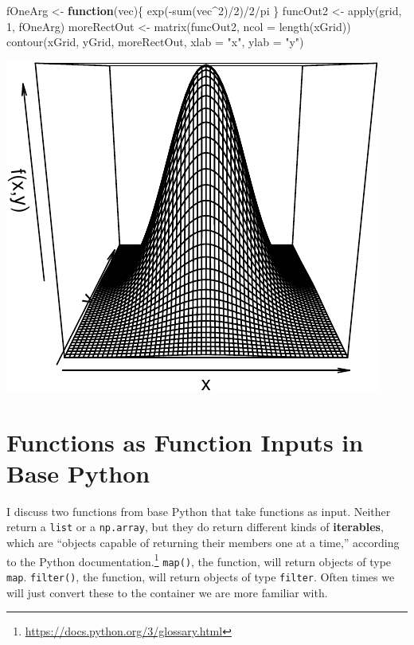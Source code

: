 \documentclass[
  12pt,
]{krantz}
\makeatletter
\newenvironment{Shaded}{\begin{snugshade}}{\end{snugshade}}
\newcommand{\AttributeTok}[1]{\textcolor[rgb]{0.61,0.61,0.61}{#1}}
\newcommand{\ControlFlowTok}[1]{\textcolor[rgb]{0.27,0.27,0.27}{\textbf{#1}}}
\newcommand{\DecValTok}[1]{\textcolor[rgb]{0.06,0.06,0.06}{#1}}
\newcommand{\FunctionTok}[1]{\textcolor[rgb]{0,0,0}{#1}}
\newcommand{\NormalTok}[1]{#1}
\newcommand{\OtherTok}[1]{\textcolor[rgb]{0.37,0.37,0.37}{#1}}
\newcommand{\SpecialCharTok}[1]{\textcolor[rgb]{0,0,0}{#1}}
\newcommand{\StringTok}[1]{\textcolor[rgb]{0.5,0.5,0.5}{#1}}
\renewcommand{\href}[2]{#2\footnote{\url{#1}}}
\newenvironment{kframe}{%
\medskip{}
\setlength{\fboxsep}{.8em}
 \def\at@end@of@kframe{}%
 \ifinner\ifhmode%
  \def\at@end@of@kframe{\end{minipage}}%
  \begin{minipage}{\columnwidth}%
 \fi\fi%
 \def\FrameCommand##1{\hskip\@totalleftmargin \hskip-\fboxsep
 \colorbox{shadecolor}{##1}\hskip-\fboxsep
     \hskip-\linewidth \hskip-\@totalleftmargin \hskip\columnwidth}%
 \MakeFramed {\advance\hsize-\width
   \@totalleftmargin\z@ \linewidth\hsize
   \@setminipage}}%
 {\par\unskip\endMakeFramed%
 \at@end@of@kframe}
\renewenvironment{Shaded}{\begin{kframe}}{\end{kframe}}
\makeatother
\begin{document}
\begin{Shaded}
\begin{Highlighting}[]
\NormalTok{fOneArg }\OtherTok{\textless{}{-}} \ControlFlowTok{function}\NormalTok{(vec)\{}
  \FunctionTok{exp}\NormalTok{(}\SpecialCharTok{{-}}\FunctionTok{sum}\NormalTok{(vec}\SpecialCharTok{\^{}}\DecValTok{2}\NormalTok{)}\SpecialCharTok{/}\DecValTok{2}\NormalTok{)}\SpecialCharTok{/}\DecValTok{2}\SpecialCharTok{/}\NormalTok{pi}
\NormalTok{\} }
\NormalTok{funcOut2 }\OtherTok{\textless{}{-}} \FunctionTok{apply}\NormalTok{(grid, }\DecValTok{1}\NormalTok{, fOneArg)}
\NormalTok{moreRectOut }\OtherTok{\textless{}{-}} \FunctionTok{matrix}\NormalTok{(funcOut2, }\AttributeTok{ncol =} \FunctionTok{length}\NormalTok{(xGrid))}
\FunctionTok{contour}\NormalTok{(xGrid, yGrid, moreRectOut, }\AttributeTok{xlab =} \StringTok{"x"}\NormalTok{, }\AttributeTok{ylab =} \StringTok{"y"}\NormalTok{)}
\end{Highlighting}
\end{Shaded}

\includegraphics{r_and_python_book_files/figure-latex/unnamed-chunk-224-1.pdf}

\hypertarget{functions-as-function-inputs-in-base-python}{%
\section{Functions as Function Inputs in Base Python}\label{functions-as-function-inputs-in-base-python}}

I discuss two functions from base Python that take functions as input. Neither return a \texttt{list} or a \texttt{np.array}, but they do return different kinds of \textbf{iterables}, which are ``objects capable of returning their members one at a time,'' \href{https://docs.python.org/3/glossary.html}{according to the Python documentation.} \texttt{map()}, the function, will return objects of type \texttt{map}. \texttt{filter()}, the function, will return objects of type \texttt{filter}. Often times we will just convert these to the container we are more familiar with.
\end{document}
